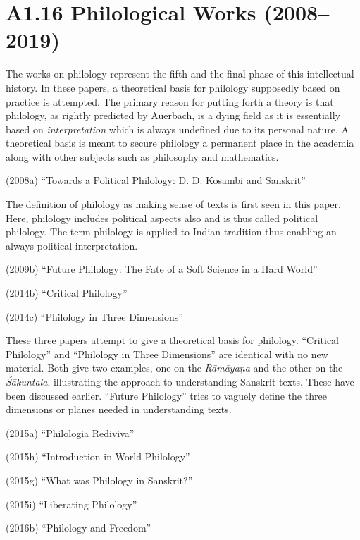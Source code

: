 \newpage

\section*{A1.16 Philological Works (2008–2019)}

The works on philology represent the fifth and the final phase of this intellectual history. In these papers, a theoretical basis for philology supposedly based on practice is attempted. The primary reason for putting forth a theory is that philology, as rightly predicted by Auerbach, is a dying field as it is essentially based on \textit{interpretation} which is always undefined due to its personal nature. A theoretical basis is meant to secure philology a permanent place in the academia along with other subjects such as philosophy and mathematics.

(2008a) “Towards a Political Philology: D. D. Kosambi and Sanskrit”

The definition of philology as making sense of texts is first seen in this paper. Here, philology includes political aspects also and is thus called political philology. The term philology is applied to Indian tradition thus enabling an always political interpretation.

(2009b) “Future Philology: The Fate of a Soft Science in a Hard World”

(2014b) “Critical Philology”

(2014c) “Philology in Three Dimensions”

These three papers attempt to give a theoretical basis for philology. “Critical Philology” and “Philology in Three Dimensions” are identical with no new material. Both give two examples, one on the \textit{Rāmāyaṇa} and the other on the \textit{Śākuntala}, illustrating the approach to understanding Sanskrit texts. These have been discussed earlier. “Future Philology” tries to vaguely define the three dimensions or planes needed in understanding texts.

(2015a) “Philologia Rediviva”

(2015h) “Introduction in World Philology”

(2015g) “What was Philology in Sanskrit?”

(2015i) “Liberating Philology”

(2016b) “Philology and Freedom”


